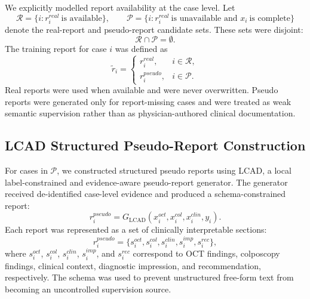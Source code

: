 We explicitly modelled report availability at the case level. Let
\begin{equation}
\mathcal{R}=\{i:r_i^{real}\ \text{is available}\},
\qquad
\mathcal{P}=\{i:r_i^{real}\ \text{is unavailable and }x_i\ \text{is complete}\}
\end{equation}
denote the real-report and pseudo-report candidate sets. These sets were disjoint:
\begin{equation}
\mathcal{R}\cap\mathcal{P}=\emptyset .
\end{equation}
The training report for case \(i\) was defined as
\begin{equation}
\tilde{r}_i=
\begin{cases}
r_i^{real}, & i\in\mathcal{R},\\
r_i^{pseudo}, & i\in\mathcal{P}.
\end{cases}
\end{equation}
Real reports were used when available and were never overwritten. Pseudo reports were generated only for report-missing cases and were treated as weak semantic supervision rather than as physician-authored clinical documentation.

\subsection{LCAD Structured Pseudo-Report Construction}
\label{subsec:methods_lcad}

For cases in \(\mathcal{P}\), we constructed structured pseudo reports using LCAD, a local label-constrained and evidence-aware pseudo-report generator. The generator received de-identified case-level evidence and produced a schema-constrained report:
\begin{equation}
r_i^{pseudo}=G_{\mathrm{LCAD}}\left(x_i^{oct},x_i^{col},x_i^{clin},y_i\right).
\end{equation}
Each report was represented as a set of clinically interpretable sections:
\begin{equation}
r_i^{pseudo}=\{s_i^{oct},s_i^{col},s_i^{clin},s_i^{imp},s_i^{rec}\},
\end{equation}
where \(s_i^{oct}\), \(s_i^{col}\), \(s_i^{clin}\), \(s_i^{imp}\), and \(s_i^{rec}\) correspond to OCT findings, colposcopy findings, clinical context, diagnostic impression, and recommendation, respectively. The schema was used to prevent unstructured free-form text from becoming an uncontrolled supervision source.

